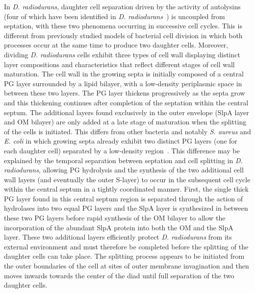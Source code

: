In \textit{D. radiodurans}, daughter cell separation driven by the activity of autolysins~\cite{vermassenCellWallHydrolases2019} (four of which have been identified in \textit{D. radiodurans}~\cite{santosInterplayMnFe2019}) is uncoupled from septation, with these two phenomena occurring in successive cell cycles.
This is different from previously studied models of bacterial cell division in which both processes occur at the same time to produce two daughter cells.
Moreover, dividing \textit{D. radiodurans} cells exhibit three types of cell wall displaying distinct layer compositions and characteristics that reflect different stages of cell wall maturation.
The cell wall in the growing septa is initially composed of a central PG layer surrounded by a lipid bilayer, with a low-density periplasmic space in between these two layers.
The PG layer thickens progressively as the septa grow and this thickening continues after completion of the septation within the central septum.
The additional layers found exclusively in the outer envelope (SlpA layer and OM bilayer) are only added at a late stage of maturation when the splitting of the cells is initiated.
This differs from other bacteria and notably \textit{S. aureus} and \textit{E. coli} in which growing septa already exhibit two distinct PG layers (one for each daughter cell) separated by a low-density region~\cite{navarroCellWallSynthesis2022,matiasCryoelectronMicroscopyCell2007}.
This difference may be explained by the temporal separation between septation and cell splitting in \textit{D. radiodurans}, allowing PG hydrolysis and the synthesis of the two additional cell wall layers (and eventually the outer S-layer) to occur in the subsequent cell cycle within the central septum in a tightly coordinated manner.
First, the single thick PG layer found in this central septum region is separated through the action of hydrolases into two equal PG layers and the SlpA layer is synthesized in between these two PG layers before rapid synthesis of the OM bilayer to allow the incorporation of the abundant SlpA protein into both the OM and the SlpA layer.
These two additional layers efficiently protect \textit{D. radiodurans} from its external environment and must therefore be completed before the splitting of the daughter cells can take place.
The splitting process appears to be initiated from the outer boundaries of the cell at sites of outer membrane invagination and then moves inwards towards the center of the diad until full separation of the two daughter cells.

